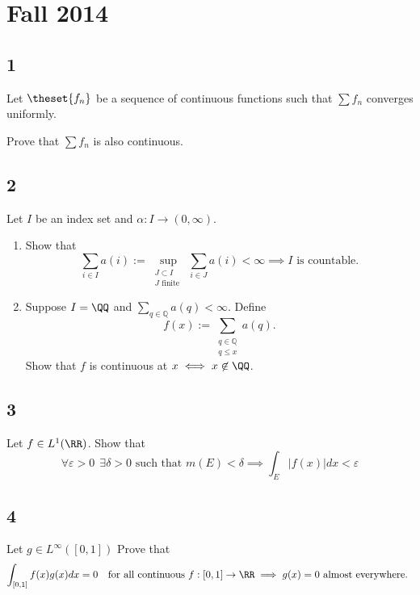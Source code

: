\hypertarget{fall-2014}{%
\section{Fall 2014}\label{fall-2014}}

\hypertarget{section}{%
\subsection{1}\label{section}}

Let \(\theset{f_n}\) be a sequence of continuous functions such that
\(\sum f_n\) converges uniformly.

Prove that \(\sum f_n\) is also continuous.

\hypertarget{section-1}{%
\subsection{2}\label{section-1}}

Let \(I\) be an index set and \(\alpha: I \to (0, \infty)\).

\begin{enumerate}
\def\labelenumi{\arabic{enumi}.}
\item
  Show that \[
  \sum_{i \in I} a(i):=\sup _{\substack{ J \subset I \\ J \text { finite }}} \sum_{i \in J} a(i)<\infty \implies I \text{ is countable.}
  \]
\item
  Suppose \(I = \QQ\) and \(\sum_{q \in \mathbb{Q}} a(q)<\infty\).
  Define \[
    f(x):=\sum_{\substack{q \in \mathbb{Q}\\ q \leq x}} a(q).
    \] Show that \(f\) is continuous at \(x \iff x\not\in \QQ\).
\end{enumerate}

\hypertarget{section-2}{%
\subsection{3}\label{section-2}}

Let \(f\in L^1(\RR)\). Show that \[
\forall\varepsilon > 0 ~~\exists \delta > 0 \text{ such that } m(E) < \delta \implies \int_{E}|f(x)| d x<\varepsilon
\]

\hypertarget{section-3}{%
\subsection{4}\label{section-3}}

Let \(g\in L^\infty([0, 1])\) Prove that \[
\int_{[0,1]} f(x) g(x) d x=0 \quad\text{for all continuous } f:[0, 1] \to \RR \implies g(x) = 0 \text{ almost everywhere. }
\]

